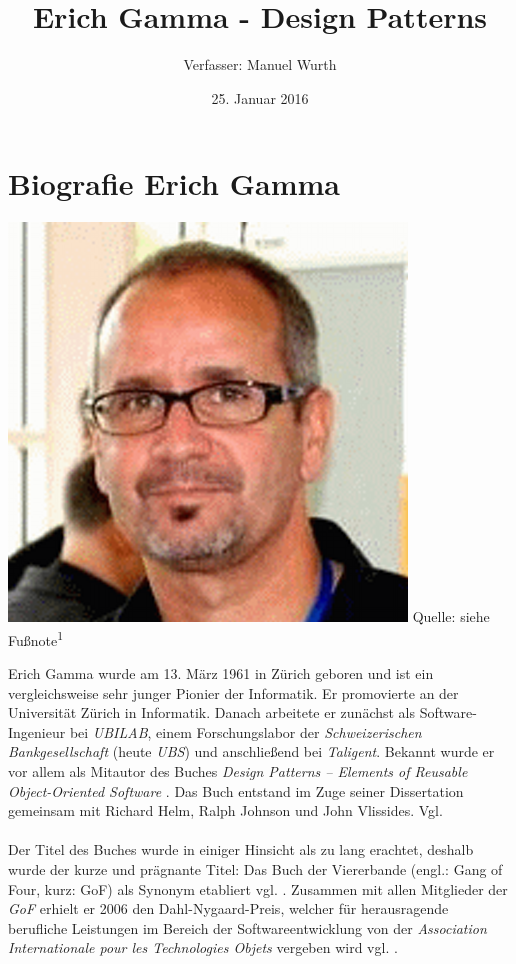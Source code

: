 \documentclass[fontsize=11pt,a4paper,final]{scrreprt}[2003/01/01]
\title{Erich Gamma - Design Patterns}
\author{Verfasser: Manuel Wurth}
\date{25. Januar 2016}
\newcommand*{\quelle}{%
	\footnotesize Quelle: 
}
\begin{document}


\maketitle
\newpage
\tableofcontents
\newpage

\chapter{Biografie Erich Gamma}\label{se:Biografie Erich Gamma}
\begin{floatingfigure}[r]{6cm}
	\begin{center}
		\includegraphics[width=0.35\linewidth]{Bilder/erich.png}
		\label{Erich Gamma}
		\quelle{siehe Fußnote\textsuperscript{1}}
	\end{center}
\end{floatingfigure}
Erich Gamma wurde am 13. März 1961 in Zürich geboren und ist ein vergleichsweise sehr junger Pionier der Informatik. Er promovierte an der Universität Zürich in Informatik. Danach arbeitete er zunächst als Software-Ingenieur bei \textit{UBILAB}, einem Forschungslabor der \textit{Schweizerischen Bankgesellschaft} (heute \textit{UBS}) und anschließend bei \textit{Taligent}. Bekannt wurde er vor allem als Mitautor des Buches \textit{Design Patterns – Elements of Reusable Object-Oriented Software} \cite{gamma2004}. Das Buch entstand im Zuge seiner Dissertation gemeinsam mit Richard Helm, Ralph Johnson und John Vlissides. Vgl. \cite{ErichGammaWikiDe} \\ \\
Der Titel des Buches wurde in einiger Hinsicht als zu lang erachtet, deshalb wurde der kurze und prägnante Titel: Das Buch der Viererbande (engl.: Gang of Four, kurz: GoF) als Synonym etabliert vgl. \cite{GangOfFour}. Zusammen mit allen Mitglieder der \textit{GoF} erhielt er 2006 den Dahl-Nygaard-Preis, welcher für herausragende berufliche Leistungen im Bereich der Softwareentwicklung von der \textit{Association Internationale pour les Technologies Objets} vergeben wird vgl. \cite{Dahl-Nygaard-Preis}. \\ \\
\end{document}
